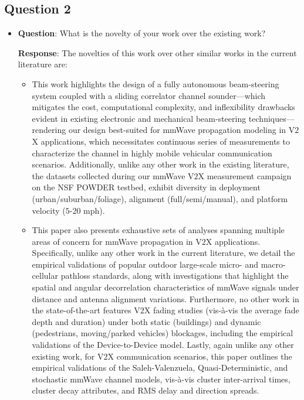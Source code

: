 \documentclass[12pt, draftcls, onecolumn]{IEEEtran}
\begin{document}
\subsection{Question 2}
\begin{itemize}
\item \textbf{Question}: What is the novelty of your work over the existing work?

\textbf{Response}: The novelties of this work over other similar works in the current literature are:
\begin{itemize}
    \item This work highlights the design of a fully autonomous beam-steering system coupled with a sliding correlator channel sounder---which mitigates the cost, computational complexity, and inflexibility drawbacks evident in existing electronic and mechanical beam-steering techniques---rendering our design best-suited for mmWave propagation modeling in V$2$X applications, which necessitates continuous series of measurements to characterize the channel in highly mobile vehicular communication scenarios. Additionally, unlike any other work in the existing literature, the datasets collected during our mmWave V$2$X measurement campaign on the NSF POWDER testbed, exhibit diversity in deployment (urban/suburban/foliage), alignment (full/semi/manual), and platform velocity ($5$-$20$ mph).
    \item This paper also presents exhaustive sets of analyses spanning multiple areas of concern for mmWave propagation in V$2$X applications. Specifically, unlike any other work in the current literature, we detail the empirical validations of popular outdoor large-scale micro- and macro-cellular pathloss standards, along with investigations that highlight the spatial and angular decorrelation characteristics of mmWave signals under distance and antenna alignment variations. Furthermore, no other work in the state-of-the-art features V$2$X fading studies (vis-\`{a}-vis the average fade depth and duration) under both static (buildings) and dynamic (pedestrians, moving/parked vehicles) blockages, including the empirical validations of the Device-to-Device model. Lastly, again unlike any other existing work, for V$2$X communication scenarios, this paper outlines the empirical validations of the Saleh-Valenzuela, Quasi-Deterministic, and stochastic mmWave channel models, vis-\`{a}-vis cluster inter-arrival times, cluster decay attributes, and RMS delay and direction spreads.
\end{itemize}
\end{itemize}
\end{document}
